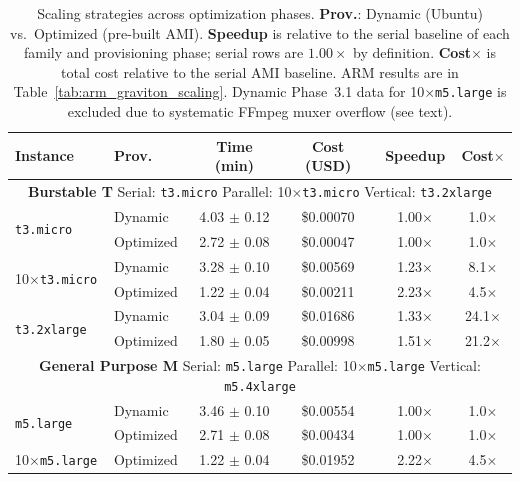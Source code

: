 \documentclass[conference]{IEEEtran}
\begin{document}
\begin{table}[!htbp]
\centering
\caption{Scaling strategies across optimization phases. \textbf{Prov.}: Dynamic (Ubuntu) vs.\ Optimized (pre-built AMI). \textbf{Speedup} is relative to the serial baseline of each family and provisioning phase; serial rows are $1.00\times$ by definition. \textbf{Cost$\times$} is total cost relative to the serial AMI baseline. ARM results are in Table~\ref{tab:arm_graviton_scaling}. Dynamic Phase~3.1 data for 10$\times$\texttt{m5.large} is excluded due to systematic FFmpeg muxer overflow (see text).}
\label{tab:scaling_all_families}
\footnotesize
\begin{tabular}{llcccc}
\toprule
\textbf{Instance} & \textbf{Prov.} & \textbf{Time (min)} & \textbf{Cost (USD)} & \textbf{Speedup} & \textbf{Cost$\times$} \\
\midrule
\multicolumn{6}{c}{\textbf{Burstable T} \quad Serial: \texttt{t3.micro} \quad Parallel: 10$\times$\texttt{t3.micro} \quad Vertical: \texttt{t3.2xlarge}} \\
\midrule
\multirow{2}{*}{\texttt{t3.micro}}      & Dynamic   & 4.03 $\pm$ 0.12 & \$0.00070 & 1.00$\times$ & 1.0$\times$ \\
                                         & Optimized & 2.72 $\pm$ 0.08 & \$0.00047 & 1.00$\times$ & 1.0$\times$ \\
\multirow{2}{*}{10$\times$\texttt{t3.micro}} & Dynamic   & 3.28 $\pm$ 0.10 & \$0.00569 & 1.23$\times$ & 8.1$\times$ \\
                                         & Optimized & 1.22 $\pm$ 0.04 & \$0.00211 & 2.23$\times$ & 4.5$\times$ \\
\multirow{2}{*}{\texttt{t3.2xlarge}}    & Dynamic   & 3.04 $\pm$ 0.09 & \$0.01686 & 1.33$\times$ & 24.1$\times$ \\
                                         & Optimized & 1.80 $\pm$ 0.05 & \$0.00998 & 1.51$\times$ & 21.2$\times$ \\
\midrule
\multicolumn{6}{c}{\textbf{General Purpose M} \quad Serial: \texttt{m5.large} \quad Parallel: 10$\times$\texttt{m5.large} \quad Vertical: \texttt{m5.4xlarge}} \\
\midrule
\multirow{2}{*}{\texttt{m5.large}}      & Dynamic   & 3.46 $\pm$ 0.10 & \$0.00554 & 1.00$\times$ & 1.0$\times$ \\
                                         & Optimized & 2.71 $\pm$ 0.08 & \$0.00434 & 1.00$\times$ & 1.0$\times$ \\
10$\times$\texttt{m5.large}               & Optimized & 1.22 $\pm$ 0.04 & \$0.01952 & 2.22$\times$ & 4.5$\times$ \\

\end{tabular}
\end{table}
\end{document}
